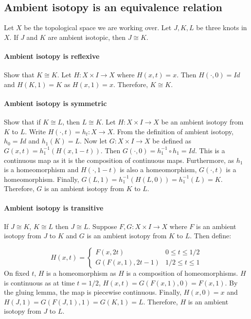 \documentclass{article}
\theoremstyle{definition}
\numberwithin{theorem}{section}
\numberwithin{equation}{section}
\begin{document}
\subsection{Ambient isotopy is an equivalence relation}
Let $X$ be the topological space we are working over. Let $J, K, L$ be three knots in $X$. If $J$ and $K$ are ambient isotopic, then $J \cong K$.
\paragraph{Ambient isotopy is reflexive}
Show that $K \cong K$. Let $H : X \times I \rightarrow X$ where $H(x, t) = x$. Then $H(\cdot, 0) = Id$ and $H(K, 1) = K$ as $H(x, 1) = x$. Therefore, $K \cong K$. 

\paragraph{Ambient isotopy is symmetric}
Show that if $K \cong L$, then $L \cong K$. Let $H : X \times I \rightarrow X$ be an ambient isotopy from $K$ to $L$. Write $H( \cdot, t) = h_t : X \rightarrow X$. From the definition of ambient isotopy, $h_0 = Id$ and $h_1(K) = L$. Now let $G : X \times I \rightarrow X$ be defined as $G(x, t) = h_1^{-1}(H(x, 1-t))$. Then $G(\cdot, 0) = h_1^{-1}\circ h_1 = Id$. This is a continuous map as it is the composition of continuous maps. Furthermore, as $h_1$ is a homeomorphism and $H(\cdot, 1-t)$ is also a homeomorphism, $G(\cdot, t)$ is a homeomorphism. Finally, $G(L, 1) = h_1^{-1}(H(L, 0)) = h_1^{-1}(L) = K$. Therefore, $G$ is an ambient isotopy from $K$ to $L$. 

\paragraph{Ambient isotopy is transitive}

If $J \cong K$, $K \cong L$ then $J \cong L$. Suppose $F, G : X \times I \rightarrow X$ where $F$ is an ambient isotopy from $J$ to $K$ and $G$ is an ambient isotopy from $K$ to $L$. Then define:

\begin{equation*}
    H(x, t) =
    \begin{cases}
        F(x, 2t) & 0 \leq t \leq 1/2\\
        G(F(x, 1), 2t-1) & 1/2 \leq t \leq 1
    \end{cases}
\end{equation*}
On fixed $t$, $H$ is a homeomorphism as $H$ is a composition of homeomorphisms. $H$ is continuous as at time $t = 1/2$, $H(x, t) = G(F(x, 1) , 0) = F(x, 1)$. By the gluing lemma, the map is piecewise continuous. Finally, $H(x, 0) = x$ and $H(J, 1) = G(F(J, 1), 1) = G(K, 1) = L$. Therefore, $H$ is an ambient isotopy from $J$ to $L$. 
\end{document}
